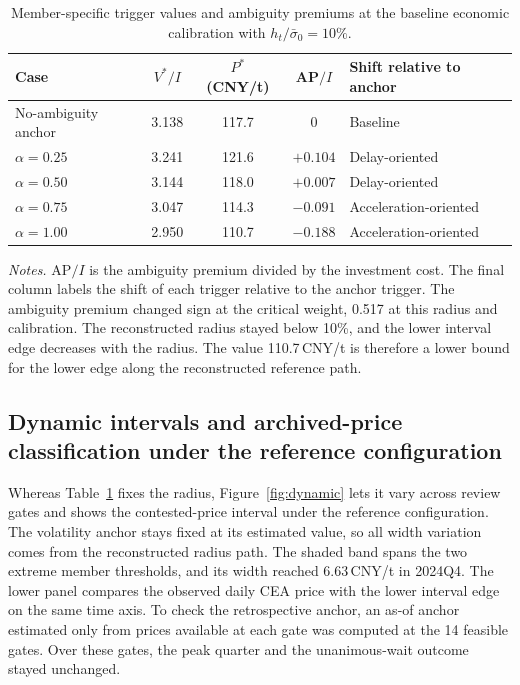 \documentclass[5p,times,authoryear]{elsarticle}
\theoremstyle{plain}
\newcommand{\sbar}{\bar{\sigma}_0}
\begin{document}
\begin{table}[!t]
\caption{Member-specific trigger values and ambiguity premiums at the baseline economic calibration with $h_t/\sbar=10\%$.}
\label{tab:members}
\centering
\scriptsize
\setlength{\tabcolsep}{3pt}
\begin{tabular}{@{}lcccl@{}}
\toprule
Case & $V^{*}/I$ & $P^{*}$ (CNY/t) & AP$/I$ & Shift relative to anchor\\
\midrule
No-ambiguity anchor & 3.138 & 117.7 & 0 & Baseline\\
$\alpha=0.25$ & 3.241 & 121.6 & $+0.104$ & Delay-oriented\\
$\alpha=0.50$ & 3.144 & 118.0 & $+0.007$ & Delay-oriented\\
$\alpha=0.75$ & 3.047 & 114.3 & $-0.091$ & Acceleration-oriented\\
$\alpha=1.00$ & 2.950 & 110.7 & $-0.188$ & Acceleration-oriented\\
\bottomrule
\end{tabular}
\par\smallskip
\parbox{\columnwidth}{\scriptsize\emph{Notes.} AP$/I$ is the ambiguity premium divided by the investment cost. The final column labels the shift of each trigger relative to the anchor trigger. The ambiguity premium changed sign at the critical weight, 0.517 at this radius and calibration. The reconstructed radius stayed below 10\%, and the lower interval edge decreases with the radius. The value 110.7\,CNY/t is therefore a lower bound for the lower edge along the reconstructed reference path.}
\end{table}

\subsection{Dynamic intervals and archived-price classification under the reference configuration}

Whereas Table~\ref{tab:members} fixes the radius, Figure~\ref{fig:dynamic} lets it vary across review gates and shows the contested-price interval under the reference configuration. The volatility anchor stays fixed at its estimated value, so all width variation comes from the reconstructed radius path. The shaded band spans the two extreme member thresholds, and its width reached 6.63\,CNY/t in 2024Q4. The lower panel compares the observed daily CEA price with the lower interval edge on the same time axis. To check the retrospective anchor, an as-of anchor estimated only from prices available at each gate was computed at the 14 feasible gates. Over these gates, the peak quarter and the unanimous-wait outcome stayed unchanged.
\end{document}
